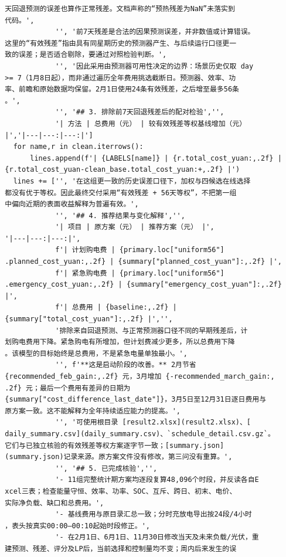 \begin{verbatim}
  天回退预测的误差也算作正常残差。文档声称的“预热残差为NaN”未落实到
  代码。',
              '', '前7天残差是合法的因果预测误差，并非数值或计算错误。
  这里的“有效残差”指由具有同星期历史的预测器产生、与后续运行口径更一
  致的误差；是否适合剔除，要通过对照检验判断。',
              '', '因此采用由预测器可用性决定的边界：场景历史仅取 day
  >= 7（1月8日起），而非通过遍历全年费用挑选截断日。预测器、效率、功
  率、前瞻和原始数据均保留。2月1日使用24条有效残差，之后增至最多56条
  。',
              '', '## 3. 排除前7天回退残差后的配对检验','',
              '| 方法 | 总费用（元） | 较有效残差等权基线增加（元）
  |','|---|---:|---:|']
    for name,r in clean.iterrows():
        lines.append(f'| {LABELS[name]} | {r.total_cost_yuan:,.2f} |
  {r.total_cost_yuan-clean_base.total_cost_yuan:+,.2f} |')
    lines += ['', '在这组更一致的历史误差口径下，加权与四候选在线选择
  都没有优于等权。因此最终交付采用“有效残差 + 56天等权”，不把第一组
  中偏向近期的表面收益解释为普遍有效。',
              '', '## 4. 推荐结果与变化解释','',
              '| 项目 | 原方案（元） | 推荐方案（元） |',
  '|---|---:|---:|',
              f'| 计划购电费 | {primary.loc["uniform56"]
  .planned_cost_yuan:,.2f} | {summary["planned_cost_yuan"]:,.2f} |',
              f'| 紧急购电费 | {primary.loc["uniform56"]
  .emergency_cost_yuan:,.2f} | {summary["emergency_cost_yuan"]:,.2f}
  |',
              f'| 总费用 | {baseline:,.2f} |
  {summary["total_cost_yuan"]:,.2f} |','',
              '排除来自回退预测、与正常预测器口径不同的早期残差后，计
  划购电费用下降。紧急购电有所增加，但计划费减少更多，所以总费用下降
  。该模型的目标始终是总费用，不是紧急电量单独最小。',
              '', f'**这是启动阶段的改善。** 2月节省
  {recommended_feb_gain:,.2f} 元，3月增加 {-recommended_march_gain:,
  .2f} 元；最后一个费用有差异的日期为
  {summary["cost_difference_last_date"]}，3月5日至12月31日逐日费用与
  原方案一致。这不能解释为全年持续适应能力的提高。',
              '', '可使用根目录 [result2.xlsx](result2.xlsx)、[
  daily_summary.csv](daily_summary.csv)、`schedule_detail.csv.gz`。
  它们与已独立核验的有效残差等权方案逐字节一致；[summary.json]
  (summary.json)记录来源。原方案文件没有修改，第三问没有重算。',
              '', '## 5. 已完成核验','',
              '- 11组完整统计期方案均逐段复算48,096个时段，并反读各自E
  xcel三表；检查能量守恒、效率、功率、SOC、互斥、跨日、初末、电价、
  实际净负载、缺口和总费用。',
              '- 基线费用与原目录汇总一致；分时充放电导出按24段/4小时
  ，表头按真实00:00—00:10起始时段修正。',
              '- 在2月1日、6月1日、11月30日修改当天及未来负载/光伏，重
  建预测、残差、评分及LP后，当前选择和控制量均不变；周内后来发生的误

\end{verbatim}

